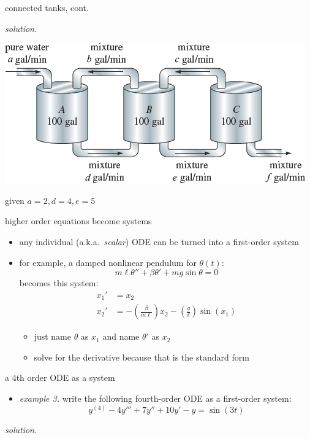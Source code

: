 \documentclass[dvipsnames,colorlinks]{beamer}
\begin{document}
\begin{frame}{connected tanks, cont.}

\noindent \emph{solution.}

\vspace{45mm}

\hfill \begin{minipage}{0.55\textwidth}
\includegraphics[width=\textwidth]{figs/three-tanks}

\scriptsize
\hfill given $a=2,d=4,e=5$
\end{minipage}
\end{frame}


\begin{frame}{higher order equations become systems}

\begin{itemize}
\item \alert{any} individual (a.k.a.~\emph{scalar}) ODE can be turned into a first-order system
\item for example, a damped nonlinear pendulum for $\theta(t)$:
    $$m \ell \theta'' + \beta \theta' + mg \sin\theta = 0$$
becomes this system:
\begin{align*}
x_1' &= x_2 \\
x_2' &= -\left(\frac{\beta}{m\ell}\right) x_2 - \left(\frac{g}{\ell}\right) \sin(x_1)
\end{align*}
    \begin{itemize}
    \item just name $\theta$ as $x_1$ and name $\theta'$ as $x_2$
    \item \small solve for the derivative because that is the standard form
    \end{itemize}
\end{itemize}
\end{frame}


\begin{frame}{a 4th order ODE as a system}

\begin{itemize}
\item \emph{example 3.}  write the following fourth-order ODE as a first-order system:
    $$y^{(4)} - 4 y''' + 7 y'' + 10 y' - y = \sin(3t)$$
\end{itemize}

\noindent \emph{solution.}

\vspace{45mm}
\end{frame}
\end{document}
